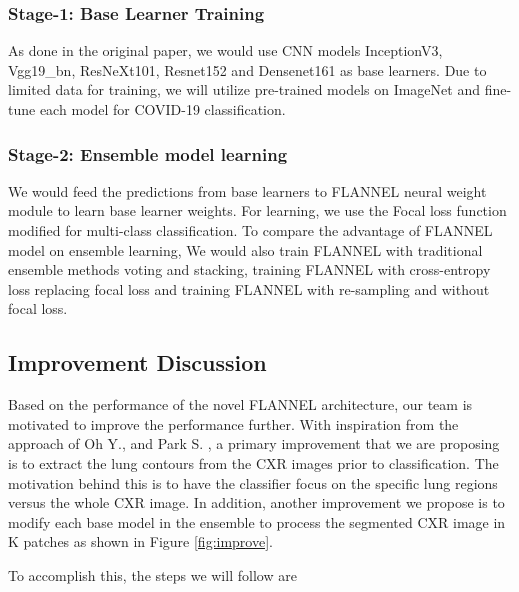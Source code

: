 \documentclass{sigkddExp}
\begin{document}
\subsubsection{Stage-1: Base Learner Training}
As done in the original paper, we would use CNN models InceptionV3, Vgg19\_bn,
ResNeXt101, Resnet152 and Densenet161 as base learners. Due to limited data for
training, we will utilize pre-trained models on ImageNet and fine-tune each
model for COVID-19 classification.

\subsubsection{Stage-2: Ensemble model learning}
We would feed the predictions from base learners to FLANNEL neural weight module
to learn base learner weights. For learning, we use the Focal loss function
modified for multi-class classification. To compare the advantage of FLANNEL
model on ensemble learning, We would also train FLANNEL with traditional
ensemble methods voting and stacking, training FLANNEL with cross-entropy loss
replacing focal loss and training FLANNEL with re-sampling and without focal
loss.

\subsection{Improvement Discussion}

Based on the performance of the novel FLANNEL architecture, our team is
motivated to improve the performance further. With inspiration from the approach
of Oh Y., and Park S. \cite{pmid32396075}, a primary improvement that we are
proposing is to extract the lung contours from the CXR images prior to
classification. The motivation behind this is to have the classifier focus on
the specific lung regions versus the whole CXR image. In addition, another
improvement we propose is to modify each base model in the ensemble to process
the segmented CXR image in K patches as shown in Figure \ref{fig:improve}.

To accomplish this, the steps we will follow are
\end{document}

